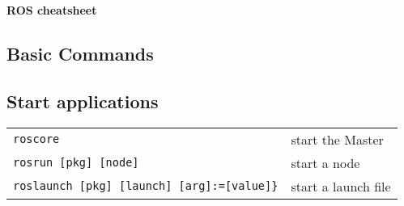 \documentclass[10pt,landscape,a4paper]{article}
\begin{document}
    \raggedright
    \footnotesize
    
    \begin{center}
         \Large{\textbf{ROS cheatsheet}} \\
    \end{center}
    
    \begin{multicols}{3}
    

        \section{Basic Commands}

        \subsection{Start applications}
            \begin{tabular}{@{}ll@{}}
                \verb!roscore!    & start the Master \\
                \verb!rosrun [pkg] [node]!    & start a node \\
                \verb!roslaunch [pkg] [launch] [arg]:=[value]}!    & start a launch file \\
            \end{tabular} \\
                

    
        
    \end{multicols}
    
    
    \newpage
    
    
    


    
\end{document}
